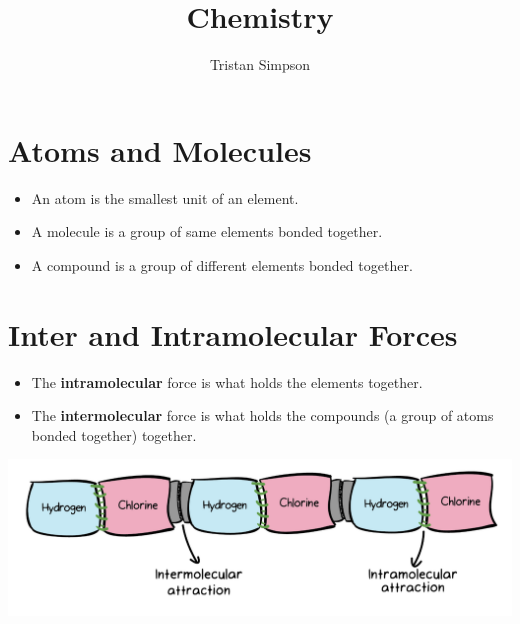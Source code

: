 \documentclass{article}
\title{Chemistry}
\author{Tristan Simpson}
\begin{document}
\maketitle
\tableofcontents

\section{Atoms and Molecules}
\begin{itemize}
    \item An atom is the smallest unit of an element.
    \item A molecule is a group of same elements bonded together.
    \item A compound is a group of different elements bonded together.
\end{itemize}

\section{Inter and Intramolecular Forces}
\begin{itemize}
    \item The \textbf{intramolecular} force is what holds the elements together.
    \item The \textbf{intermolecular} force is what holds the compounds (a group of atoms bonded together) together.
\end{itemize}
\includegraphics[scale=0.33]{images/molecularforces.png}
\end{document}

